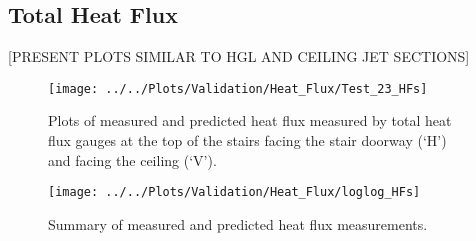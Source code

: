 \clearpage
\subsection{Total Heat Flux}
[PRESENT PLOTS SIMILAR TO HGL AND CEILING JET SECTIONS]
\begin{figure}[!h]
	\centering
	\texttt{[image: ../../Plots/Validation/Heat\_Flux/Test\_23\_HFs]}
	\caption[Plots of measured and predicted heat flux during Test~23.]{Plots of measured and predicted heat flux measured by total heat flux gauges at the top of the stairs facing the stair doorway (`H') and facing the ceiling (`V').}
	\label{fig:Test23_HF1}
\end{figure}

\begin{figure}[!h]
	\centering
	\texttt{[image: ../../Plots/Validation/Heat\_Flux/loglog\_HFs]}
	\caption{Summary of measured and predicted heat flux measurements.}
	\label{fig:loglog_HFs}
\end{figure}

\clearpage
